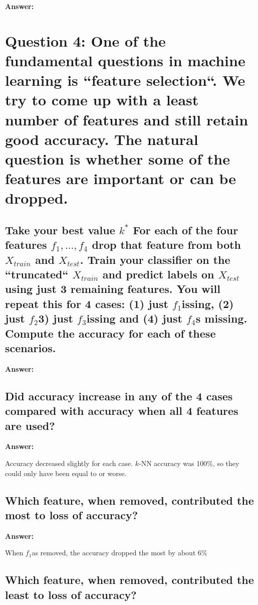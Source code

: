 \documentclass[12pt, a4paper]{extarticle}
\newcommand{\answer}[1]{\textbf{Answer: }\par#1}
\newcommand{\knn}{\texorpdfstring{$k$-NN}}
\newcommand{\xtest}{\texorpdfstring{$X_{test}$}}
\newcommand{\xtrain}{\texorpdfstring{$X_{train}$}}
\newcommand{\var}[1]{\texorpdfstring{#1}\xspace}
\newcommand{\fixture}[1]{\texorpdfstring{\ensuremath{f_{#1}}}\xspace}
\begin{document}
    \answer{}

    \section{Question 4: {\normalfont\normalsize{One of the fundamental questions in machine learning is ``feature selection``. We try to come up with a least number of features and still retain good accuracy. The natural question is whether some of the features are important or can be dropped.}}} \label{sec:question4}

    \subsection{Take your best value \var{$k^*$}. For each of the four features \var{$f_1,\dots,f_4$}, drop that feature from both \xtrain{} and \xtest{}. Train your classifier on the ``truncated`` \xtrain{} and predict labels on \xtest{} using just 3 remaining features. You will repeat this for 4 cases: (1) just \fixture{1} missing, (2) just \fixture{2} (3) just \fixture{3} missing and (4) just \fixture{4} is missing. Compute the accuracy for each of these scenarios.} \label{subsec:question4.1}

    \answer{}

    \subsection{Did accuracy increase in any of the 4 cases compared with accuracy when all 4 features are used?} \label{subsec:question4.2}

    \answer{Accuracy decreased slightly for each case. \knn{} accuracy was 100\%, so they could only have been equal to or worse.}

    \subsection{Which feature, when removed, contributed the most to loss of accuracy?} \label{subsec:question4.3}

    \answer{When \fixture{1} was removed, the accuracy dropped the most by about 6\%}

    \subsection{Which feature, when removed, contributed the least to loss of accuracy?} \label{subsec:question4.4}
\end{document}

